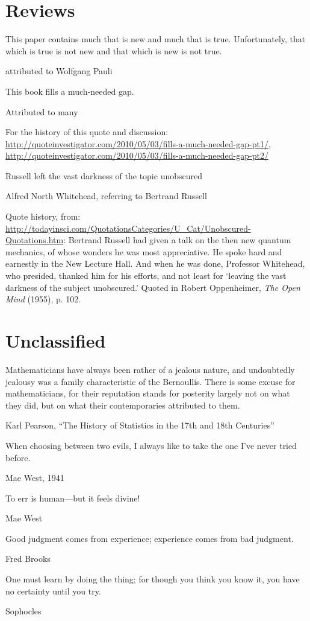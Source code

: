 \section{Reviews}
\epigraph{This paper contains much that is new and much that is true. Unfortunately, that which is true is not new and that which is new is not true.}{attributed to Wolfgang Pauli}

\epigraph{This book fills a much-needed gap.}{Attributed to many}

For the history of this quote and discussion:
\url{http://quoteinvestigator.com/2010/05/03/fills-a-much-needed-gap-pt1/}, 
\url{http://quoteinvestigator.com/2010/05/03/fills-a-much-needed-gap-pt2/}

\epigraph{Russell left the vast darkness of the topic unobscured}{Alfred North Whitehead, referring to Bertrand Russell}

Quote history, from: \url{http://todayinsci.com/QuotationsCategories/U_Cat/Unobscured-Quotations.htm}:
Bertrand Russell had given a talk on the then new quantum mechanics, of whose wonders he was most appreciative. He spoke hard and earnestly in the New Lecture Hall. And when he was done, Professor Whitehead, who presided, thanked him for his efforts, and not least for `leaving the vast darkness of the subject unobscured.' 
Quoted in Robert Oppenheimer, \emph{The Open Mind} (1955), p. 102. 


\section{Unclassified}


\epigraph{Mathematicians have always been rather of a jealous nature, and undoubtedly jealousy was a family characteristic of the Bernoullis.  There is some excuse for mathematicians, for their reputation stands for posterity largely not on what they did, but on what their contemporaries attributed to them.}{Karl Pearson, ``The History of Statistics in the 17th and 18th Centuries'' \cite[p. 226]{Pearson:1978}}

\epigraph{When choosing between two evils, I always like to take the one I've never tried before.}{Mae West, 1941}

\epigraph{To err is human---but it feels divine!}{Mae West}

\epigraph{Good judgment comes from experience; experience comes from bad judgment.}{Fred Brooks}


\epigraph{One must learn by doing the thing; for though you think you know it, you have no certainty until you try.}{Sophocles}


	

